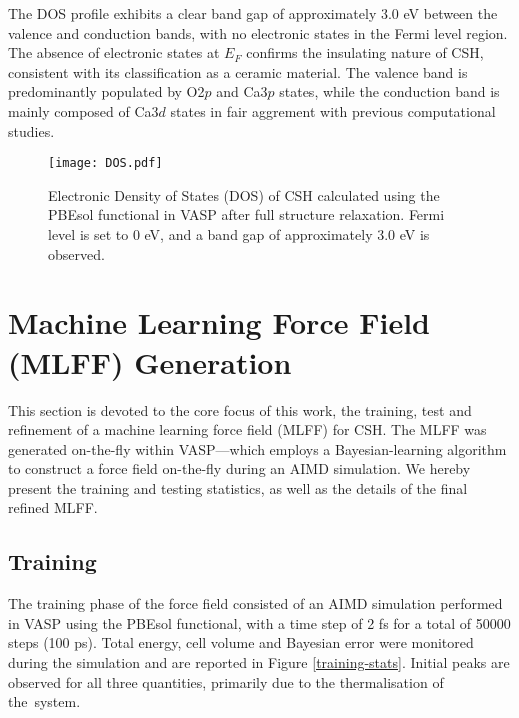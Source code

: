 The DOS profile exhibits a clear band gap of approximately 3.0 eV between the valence and conduction bands, with no electronic states in the Fermi level region. The absence of electronic states at $E_F$ confirms the insulating nature of CSH, consistent with its classification as a ceramic material. The valence band is predominantly populated by O2$p$ and Ca3$p$ states, while the conduction band is mainly composed of Ca3$d$ states in fair aggrement with previous computational studies\supercite{Dharmawardhana2018}. 
\begin{figure}[H]
    \centering
    \texttt{[image: DOS.pdf]}
    \caption{
        Electronic Density of States (DOS) of CSH calculated using the PBEsol functional in VASP after full structure relaxation. Fermi level is set to 0 eV, and a band gap of approximately 3.0 eV is observed. 
    }
    \label{dos}
\end{figure}

\section{Machine Learning Force Field (MLFF) Generation}
\label{sec:mlff-training}

This section is devoted to the core focus of this work, the training,  test and refinement of a machine learning force field (MLFF) for CSH. The MLFF was generated on-the-fly within VASP---which employs a Bayesian-learning algorithm to construct a force field on-the-fly during an AIMD simulation\supercite{zotero-item-773}. We hereby present the training and testing statistics, as well as the details of the final refined MLFF. 
\subsection{Training}
The training phase of the force field consisted of an AIMD simulation performed in VASP using the PBEsol functional, with a time step of 2 fs for a total of 50000 steps (100 ps). Total energy, cell volume and Bayesian error were monitored during the simulation and are reported in Figure \ref{training-stats}. Initial peaks are observed for all three quantities, primarily due to the thermalisation of the~system.

